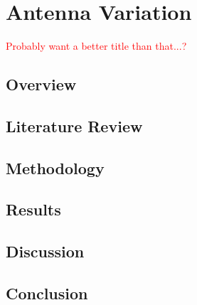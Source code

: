 \chapter{Antenna Variation}
\textcolor{red}{Probably want a better title than that...?}
\section{Overview}
\section{Literature Review}
\section{Methodology}
\section{Results}
\section{Discussion}
\section{Conclusion}